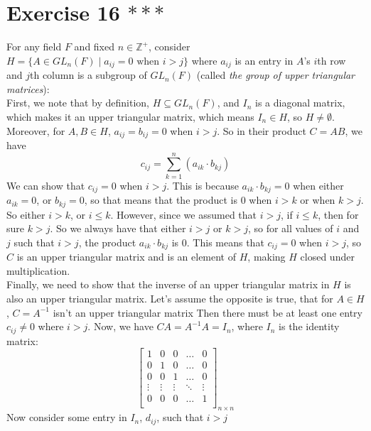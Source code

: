 \documentclass{article}
\newcommand{\Z}{\mathbb{Z}}
\begin{document}
    \section*{Exercise 16 $***$}
    For any field $F$ and fixed $n \in \Z^+$,
    consider $H = \{ A \in GL_n(F) \mid a_{ij} = 0 \text{ when } i > j\}$
    where $a_{ij}$ is an entry in $A$'s $i$th row and $j$th column
    is a subgroup of $GL_n(F)$
    (called \textit{ the group of upper triangular matrices}): \\
    First, we note that by definition, $H \subseteq GL_n(F)$,
    and $I_n$ is a diagonal matrix,
    which makes it an upper triangular matrix,
    which means $I_n \in H$,
    so $H \neq \emptyset$. \\ 
    Moreover, for $A, B \in H$, $a_{ij} = b_{ij} = 0$ when $i > j$.
    So in their product $C = AB$, we have 
    \[ c_{ij} = \sum_{k = 1}^n (a_{ik} \cdot b_{kj}) \]
    We can show that $c_{ij} = 0$ when $i > j$.
    This is because $a_{ik} \cdot b_{kj} = 0$
    when either $a_{ik} = 0$, or $b_{kj} = 0$,
    so that means that the product is 0 when $i > k$
    or when $k > j$.
    So either $i > k$, or $i \leqslant k$.
    However, since we assumed that $i > j$,
    if $i \leqslant k$, then for sure $k > j$.
    So we always have that either $i > j$ or $k > j$,
    so for all values of $i$ and $j$ such that $i > j$,
    the product $a_{ik} \cdot b_{kj}$ is 0.
    This means that $c_{ij} = 0$ when $i > j$,
    so $C$ is an upper triangular matrix and is an element of $H$,
    making $H$ closed under multiplication. \\ 
    Finally, we need to show that the inverse of an upper triangular
    matrix in $H$ is also an upper triangular matrix.
    Let's assume the opposite is true, that for $A \in H$,
    $C = A^{-1}$ isn't an upper triangular matrix
    Then there must be at least one entry $c_{ij} \neq 0$
    where $i > j$.
    Now, we have $CA = A^{-1}A = I_n$,
    where $I_n$ is the identity matrix:
    \[ \begin{bmatrix}
        1 & 0 & 0 & \dots & 0 \\
        0 & 1 & 0 & \dots & 0 \\
        0 & 0 & 1 & \dots & 0 \\
        \vdots & \vdots & \vdots & \ddots & \vdots \\
        0 & 0 & 0 & \dots & 1 \\
    \end{bmatrix}_{n \times n} \]
    Now consider some entry in $I_n$, $d_{ij}$, such that $i > j$
\end{document}
